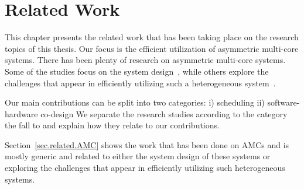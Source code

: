 \chapter{Related Work}
\label{chapter.related}
This chapter presents the related work that has been taking place on the research topics of this thesis.
Our focus is the efficient utilization of asymmetric multi-core systems.
There has been plenty of research on asymmetric multi-core systems. 
Some of the studies focus on the system design~\cite{Kumar_micro_2003,Balakrishnan:ISCA2005, Morad_area_based}, while others explore the challenges that appear in efficiently utilizing such a heterogeneous system~\cite{Kumar:ISCA2004,Joao:ASPLOS2012,Joao:ISCA2013}.


Our main contributions can be split into two categories:
i) scheduling 
ii) software-hardware co-design
We separate the research studies according to the category the fall to and explain how they relate to our contributions.

Section~\ref{sec.related.AMC} shows the work that has been done on AMCs and is mostly generic and related to either the system design of these systems or exploring the challenges that appear in efficiently utilizing such heterogeneous systems. 

